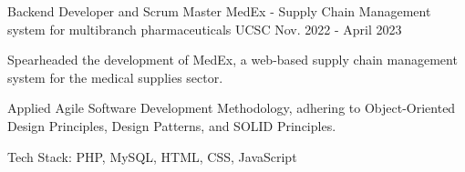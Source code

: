 \begin{cventries}
    \cventry
    {Backend Developer and Scrum Master} %
    {MedEx - Supply Chain Management system for multibranch pharmaceuticals \href{https://github.com/kulasinghet/MedEx}{\faGithubSquare}} %
    {UCSC} %
    {Nov. 2022 - April 2023} %
    {
        \begin{cvitems} %
            \item {Spearheaded the development of MedEx, a web-based supply chain management system for the medical supplies sector.}
            \item {Applied Agile Software Development Methodology, adhering to Object-Oriented Design Principles, Design Patterns, and SOLID Principles.}
            \item {Tech Stack: PHP, MySQL, HTML, CSS, JavaScript}
        \end{cvitems}
    }




\end{cventries}

